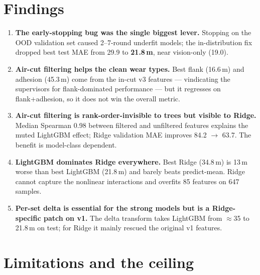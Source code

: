 \documentclass[11pt,a4paper]{article}
\newcommand{\um}{\,\textmu m}
\begin{document}
\section{Findings}

\begin{enumerate}
\item \textbf{The early-stopping bug was the single biggest lever.} Stopping on
    the OOD validation set caused 2--7-round underfit models; the in-distribution
    fix dropped best test MAE from 29.9 to \textbf{21.8\um}, near vision-only
    (19.0).
\item \textbf{Air-cut filtering helps the clean wear types.} Best flank
    (16.6\um) and adhesion (45.3\um) come from the in-cut v3 features ---
    vindicating the supervisors for flank-dominated performance --- but it
    regresses on flank+adhesion, so it does not win the overall metric.
\item \textbf{Air-cut filtering is rank-order-invisible to trees but visible to
    Ridge.} Median Spearman 0.98 between filtered and unfiltered features
    explains the muted LightGBM effect; Ridge validation MAE improves 84.2 $\to$
    63.7. The benefit is model-class dependent.
\item \textbf{LightGBM dominates Ridge everywhere.} Best Ridge (34.8\um) is
    13\um{} worse than best LightGBM (21.8\um) and barely beats predict-mean.
    Ridge cannot capture the nonlinear interactions and overfits 85 features on
    647 samples.
\item \textbf{Per-set delta is essential for the strong models but is a
    Ridge-specific patch on v1.} The delta transform takes LightGBM from
    $\approx$35 to 21.8\um{} on test; for Ridge it mainly rescued the original
    v1 features.
\end{enumerate}

\section{Limitations and the ceiling}
\end{document}
